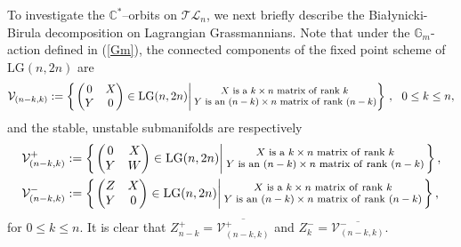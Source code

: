 \documentclass[10pt]{amsart}
\theoremstyle{definition}
\newtheorem{definition}[theorem]{Definition}
\newcommand{\LG}{\operatorname{LG}}
\theoremstyle{plain} %
\begin{document}
To investigate the $\mathbb C^*$--orbits on $\mathcal {TL}_{n}$, we next briefly describe the Bia{\l}ynicki-Birula decomposition on Lagrangian Grassmannians. Note that under the $\mathbb G_m$-action defined in (\ref{Gm}), the connected components of the fixed point scheme of $\mathrm{LG}(n,2n)$ are
\begin{equation*}%
\begin{split}
&\mathcal V_{(n-k,k)} :=\left\{\left. \left(
\begin{matrix}
0&X\\
Y&0\\
\end{matrix}\right)\in \mathrm{LG}(n,2n)\right\vert_{}\footnotesize\begin{matrix}
X\,\,{\rm is\,\,a\,\,}k\times n\,\,{\rm matrix\,\,of\,\,rank}\,\,k\,\\
Y\,\,{\rm is\,\,an\,\,}(n-k)\times n\,\,{\rm matrix\,\,of\,\,rank}\,\,(n-k)\\
\end{matrix}
\right\}\,,\,\,\,\,0\leq k\leq n,\\
\end{split}
\end{equation*}
and the stable, unstable submanifolds are respectively
\begin{equation}\label{vani}
\begin{split}
&\mathcal V_{(n-k,k)}^+:= \left\{\left.\left(
\begin{matrix}
0&X\\
Y&W\\
\end{matrix}\right)\in \LG(n,2n)\right\vert_{}\footnotesize\begin{matrix}
X\,\,{\rm is\,\,a\,\,}k\times n\,\,{\rm matrix \,\,of\,\,rank\,\,}k\,\\
Y\,\,{\rm is\,\,an\,\,}(n-k)\times n\,\,{\rm matrix \,\,of\,\,rank\,\,}(n-k)\,\\
\end{matrix}\right\},\\
&\mathcal V_{(n-k,k)}^-:= \left\{\left.\left(
\begin{matrix}
Z&X\\
Y&0\\
\end{matrix}\right)\in \mathrm{LG}(n,2n)\right\vert_{}{\footnotesize\begin{matrix}
X\,\,{\rm is\,\,a\,\,}k\times n\,\,{\rm matrix \,\,of\,\,rank\,\,}k\,\\
Y\,\,{\rm is\,\,an\,\,}(n-k)\times n\,\,{\rm matrix \,\,of\,\,rank\,\,}(n-k)\,\\
\end{matrix}}\right\},    
\end{split}
\end{equation}
for $0\leq k\leq n$. It is clear that $Z^+_{n-k}=\overline{\mathcal V_{(n-k,k)}^+}$ and  $Z^-_{k}=\overline{\mathcal V_{(n-k,k)}^-}$.   
\end{document}
